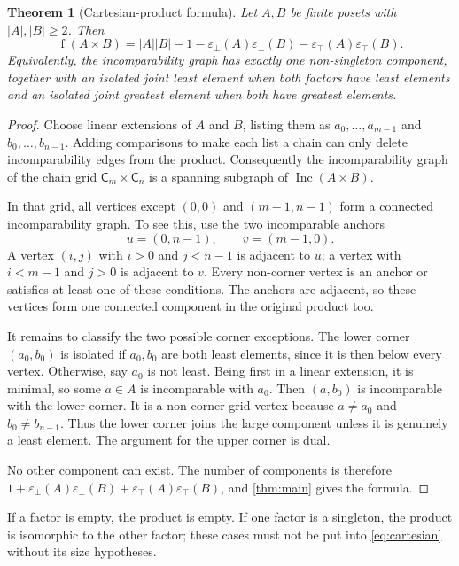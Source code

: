 \documentclass[11pt,letterpaper]{article}
\newtheorem{theorem}{Theorem}[section]
\theoremstyle{definition}
\theoremstyle{remark}
\newcommand{\fot}{\operatorname{f}}
\newcommand{\Inc}{\operatorname{Inc}}
\newcommand{\C}{\mathsf C}
\newcommand{\epsbot}{\varepsilon_{\bot}}
\newcommand{\epstop}{\varepsilon_{\top}}
\begin{document}
\begin{theorem}[Cartesian-product formula]\label{thm:cartesian}
Let $A,B$ be finite posets with $|A|,|B|\geq2$. Then
\begin{equation}\label{eq:cartesian}
 \boxed{\fot(A\times B)=|A||B|-1
 -\epsbot(A)\epsbot(B)-\epstop(A)\epstop(B).}
\end{equation}
Equivalently, the incomparability graph has exactly one non-singleton
component, together with an isolated joint least element when both factors
have least elements and an isolated joint greatest element when both have
greatest elements.
\end{theorem}
\begin{proof}
Choose linear extensions of $A$ and $B$, listing them as
$a_0,\ldots,a_{m-1}$ and $b_0,\ldots,b_{n-1}$. Adding comparisons to make
each list a chain can only delete incomparability edges from the product.
Consequently the incomparability graph of the chain grid
$\C_m\times\C_n$ is a spanning subgraph of $\Inc(A\times B)$.

In that grid, all vertices except $(0,0)$ and $(m-1,n-1)$ form a connected
incomparability graph. To see this, use the two incomparable anchors
\[
 u=(0,n-1),\qquad v=(m-1,0).
\]
A vertex $(i,j)$ with $i>0$ and $j<n-1$ is adjacent to $u$; a vertex with
$i<m-1$ and $j>0$ is adjacent to $v$. Every non-corner vertex is an anchor
or satisfies at least one of these conditions. The anchors are adjacent,
so these vertices form one connected component in the original product too.

It remains to classify the two possible corner exceptions. The lower corner
$(a_0,b_0)$ is isolated if $a_0,b_0$ are both least elements, since it is
then below every vertex. Otherwise, say $a_0$ is not least. Being first in
a linear extension, it is minimal, so some $a\in A$ is incomparable with
$a_0$. Then $(a,b_0)$ is incomparable with the lower corner. It is a
non-corner grid vertex because $a\ne a_0$ and $b_0\ne b_{n-1}$.
Thus the lower corner joins the large component unless it is genuinely a
least element. The argument for the upper corner is dual.

No other component can exist. The number of components is therefore
$1+\epsbot(A)\epsbot(B)+\epstop(A)\epstop(B)$, and \cref{thm:main} gives
the formula.
\end{proof}

If a factor is empty, the product is empty. If one factor is a singleton,
the product is isomorphic to the other factor; these cases must not be put
into \eqref{eq:cartesian} without its size hypotheses.
\end{document}
